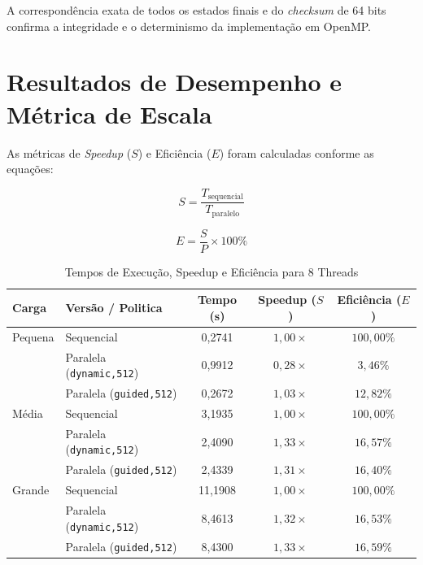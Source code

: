 \documentclass[a4paper,12pt]{article}
\begin{document}
A correspondência exata de todos os estados finais e do \textit{checksum} de 64 bits confirma a integridade e o determinismo da implementação em OpenMP.

\section{Resultados de Desempenho e Métrica de Escala}

As métricas de \textit{Speedup} ($S$) e Eficiência ($E$) foram calculadas conforme as equações:

\begin{equation}
S = \frac{T_{\text{sequencial}}}{T_{\text{paralelo}}}
\end{equation}

\begin{equation}
E = \frac{S}{P} \times 100\%
\end{equation}

\begin{table}[htbp]
\centering
\caption{Tempos de Execução, Speedup e Eficiência para 8 Threads}
\label{tab:resultados}
\vspace{0.2cm}

\begin{tabular}{llccc}
\toprule
\textbf{Carga} & \textbf{Versão / Politica} & \textbf{Tempo (s)} & \textbf{Speedup ($S$)} & \textbf{Eficiência ($E$)} \\ \midrule
Pequena & Sequencial           & 0,2741 & $1,00\times$ & $100,00\%$ \\
        & Paralela (\texttt{dynamic,512}) & 0,9912 & $0,28\times$ & $3,46\%$ \\
        & Paralela (\texttt{guided,512})  & 0,2672 & $1,03\times$ & $12,82\%$ \\ \midrule
Média   & Sequencial           & 3,1935 & $1,00\times$ & $100,00\%$ \\
        & Paralela (\texttt{dynamic,512}) & 2,4090 & $1,33\times$ & $16,57\%$ \\
        & Paralela (\texttt{guided,512})  & 2,4339 & $1,31\times$ & $16,40\%$ \\ \midrule
Grande  & Sequencial           & 11,1908 & $1,00\times$ & $100,00\%$ \\
        & Paralela (\texttt{dynamic,512}) & 8,4613 & $1,32\times$ & $16,53\%$ \\
        & Paralela (\texttt{guided,512})  & 8,4300 & $1,33\times$ & $16,59\%$ \\ \bottomrule
\end{tabular}
\end{table}
\end{document}
